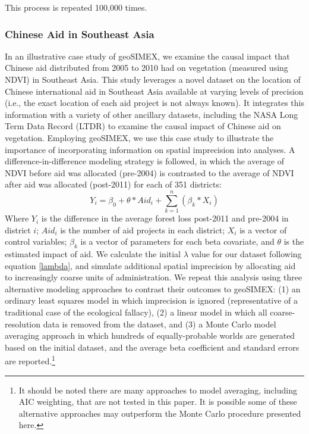 This process is repeated 100,000 times. 

\subsubsection{Chinese Aid in Southeast Asia}
In an illustrative case study of geoSIMEX, we examine the causal impact that Chinese aid distributed from 2005 to 2010 had on vegetation (measured using NDVI) in Southeast Asia.  
This study leverages a novel dataset on the location of Chinese international aid in Southeast Asia available at varying levels of precision (i.e., the exact location of each aid project is not always known).  
It integrates this information with a variety of other ancillary datasets, including the NASA Long Term Data Record (LTDR) to examine the causal impact of Chinese aid on vegetation.  
Employing geoSIMEX, we use this case study to illustrate the importance of incorporating information on spatial imprecision into analyses.
A difference-in-difference modeling strategy is followed, in which the average of NDVI before aid was allocated (pre-2004) is contrasted to the average of NDVI after aid was allocated (post-2011) for each of 351 districts:
\begin{equation}\label{eq:caseStudy}
Y_{i} = \beta_0 + \theta * Aid_{i} + \sum_{k=1}^{n}(\beta_{k} * X_{i})
\end{equation}
Where $Y_{i}$ is the difference in the average forest loss post-2011 and pre-2004 in district $i$; $Aid_{i}$ is the number of aid projects in each district; $X_{i}$ is a vector of control variables; $\beta_{k}$ is a vector of parameters for each beta covariate, and $\theta$ is the estimated impact of aid.
We calculate the initial $\lambda$ value for our dataset following equation \ref{lambda}, and simulate additional spatial imprecision by allocating aid to increasingly coarse units of administration.  
We repeat this analysis using three alternative modeling approaches to contrast their outcomes to geoSIMEX: (1) an ordinary least squares model in which imprecision is ignored (representative of a traditional case of the ecological fallacy), (2) a linear model in which all coarse-resolution data is removed from the dataset, and (3) a Monte Carlo model averaging approach in which hundreds of equally-probable worlds are generated based on the initial dataset, and the average beta coefficient and standard errors are reported.\footnote{It should be noted there are many approaches to model averaging, including AIC weighting, that are not tested in this paper. It is possible some of these alternative approaches may outperform the Monte Carlo procedure presented here.}



